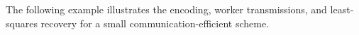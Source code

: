\documentclass[journal,draftcls,onecolumn]{IEEEtran}
\theoremstyle{mystyle}
\newcommand{\bfB}{\mathbf{B}}
\begin{document}

The following example illustrates the encoding, worker transmissions, and least-squares recovery for a small communication-efficient scheme.
\end{document}
